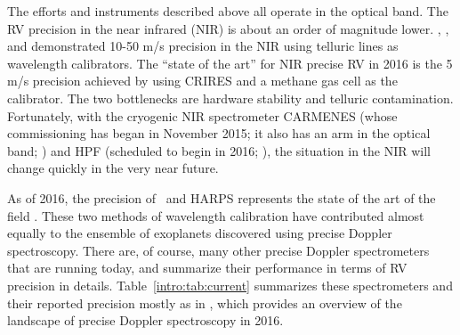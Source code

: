 The efforts and instruments described above all operate in the optical
band. The RV precision in the near infrared (NIR) is about an order of
magnitude lower. \cite{2010ApJ...723..684B},
\cite{2010A&A...511A..55F}, and \cite{2012ApJ...749...16B}
demonstrated 10-50 m/s precision in the NIR using telluric lines as
wavelength calibrators. The ``state of the art'' for NIR precise RV in
2016 is the 5 m/s precision achieved by \cite{2010ApJ...713..410B}
using CRIRES and a methane gas cell as the calibrator. The two
bottlenecks are hardware stability and telluric
contamination. Fortunately, with the cryogenic NIR spectrometer
CARMENES (whose commissioning has began in November 2015; it also has
an arm in the optical band; \citealt{2014SPIE.9147E..1FQ}) and HPF
(scheduled to begin in 2016; \citealt{2012SPIE.8446E..1SM}), the
situation in the NIR will change quickly in the very near future.

As of 2016, the precision of \keck\ and HARPS represents the state of
the art of the field . These two methods of
wavelength calibration have contributed almost equally to the ensemble
of exoplanets discovered using precise Doppler spectroscopy. There
are, of course, many other precise Doppler spectrometers that are
running today, and \cite{eprv2015} summarize their performance in
terms of RV precision in details. Table~\ref{intro:tab:current}
summarizes these spectrometers and their reported precision mostly as
in \cite{eprv2015}, which provides an overview of the landscape of
precise Doppler spectroscopy in 2016.

